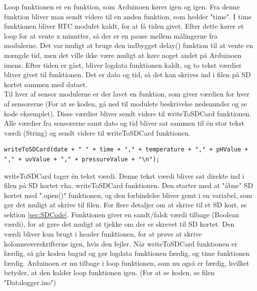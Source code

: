 		\newpage
		Loop funktionen er en funktion, som Arduinoen kører igen og igen. Fra denne funktion bliver man sendt videre til en anden funktion, som hedder "time". I time funktionen bliver RTC modulet kaldt, for at få tiden givet. Efter dette kører et loop for at vente x minutter, så der er en pause mellem målingerne fra modulerne. Det var muligt at bruge den indbygget delay() funktion til at vente en mængde tid, men det ville ikke være muligt at køre noget andet på Arduinoen imens. Efter tiden er gået, bliver logdata funktionen kaldt, og to tekst værdier bliver givet til funktionen. Det er dato og tid, så det kan skrives ind i filen på SD kortet sammen med dataet. \\ [7pt]
		Til hver af sensor modulerne er der lavet en funktion, som giver værdien for hver af sensorerne (For at se koden, gå ned til modulets beskrivelse nedenunder og se kode eksemplet). Disse værdier bliver sendt videre til writeToSDCard funktionen. Alle værdier fra sensorerne samt dato og tid bliver sat sammen til én stor tekst værdi (String) og sendt videre til writeToSDCard funktionen.
		\begin{lstlisting}
writeToSDCard(date + " " + time + "," + temperature + "," + pHValue + "," + uvValue + "," + pressureValue + "\n");
		\end{lstlisting}
		writeToSDCard tager én tekst værdi. Denne tekst værdi bliver sat direkte ind i filen på SD kortet vha. writeToSDCard funktionen. Den starter med at "åbne"{} SD kortet med ".open()"{} funktionen, og den forbindelse bliver gemt i en variabel, som gør det muligt at skrive til filen. For flere detaljer om at skrive til et SD kort, se sektion \ref{sec:SDCode}. Funktionen giver en sandt/falsk værdi tilbage (Boolean værdi), for at gøre det muligt at tjekke om der er skrevet til SD kortet. Den værdi bliver kun brugt i header funktionen, for at prøve at skrive kolonneoverskrifterne igen, hvis den fejler. Når writeToSDCard funktionen er færdig, så går koden bagud og gør logdata funktionen færdig, og time funktionen færdig. Arduinoen er nu tilbage i loop funktionen, som nu også er færdig, hvilket betyder, at den kalder loop funktionen igen. (For at se koden, se filen "Datalogger.ino")
		

